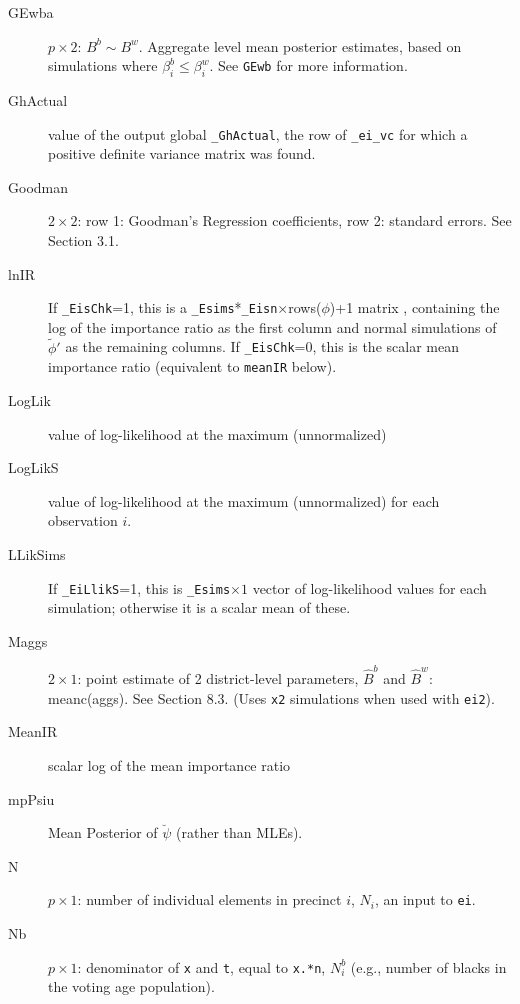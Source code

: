 \documentclass[11pt,titlepage]{article}
\newcommand{\psiu}{\breve{\psi}}
\newcommand{\Nbp}{{N_i^{b}}}
\newcommand{\Npp}{{N_i}}
\begin{document}
\begin{description}
\item[GEwba] $p\times 2$: $B^b\sim B^w$.  Aggregate level mean
  posterior estimates, based on simulations where
  $\beta_i^b\leq\beta_i^w$.  See \texttt{GEwb} for more information.
  
\item[GhActual] value of the output global \texttt{\_GhActual}, the
  row of \texttt{\_ei\_vc} for which a positive definite variance
  matrix was found.

\item[Goodman] $2\times 2$: row 1: Goodman's Regression coefficients,
  row 2: standard errors.  See Section 3.1.

\item[lnIR] If \texttt{\_EisChk}=1, this is a
  \texttt{\_Esims}*\texttt{\_Eisn}$\times$rows($\phi$)+1 matrix ,
  containing the log of the importance ratio as the first column and
  normal simulations of $\tilde{\phi}'$ as the remaining columns.  If
  \texttt{\_EisChk}=0, this is the scalar mean importance ratio
  (equivalent to \texttt{meanIR} below).

\item[LogLik] value of log-likelihood at the maximum (unnormalized)

\item[LogLikS] value of log-likelihood at the maximum (unnormalized)
  for each observation $i$.

\item[LLikSims] If \texttt{\_EiLlikS}=1, this is \texttt{\_Esims}$\times
  1$ vector of log-likelihood values for each simulation; otherwise it
  is a scalar mean of these.

\item[Maggs] $2\times 1$: point estimate of 2 district-level
  parameters, $\hat{B}^b$ and $\hat{B}^w$: meanc(aggs).  See Section
  8.3.  (Uses \texttt{x2} simulations when used with \texttt{ei2}).

\item[MeanIR] scalar log of the mean importance ratio

\item[mpPsiu] Mean Posterior of $\psiu$ (rather than MLEs).

\item[N] $p\times 1$: number of individual elements in precinct $i$,
  $\Npp$, an input to \texttt{ei}.

\item[Nb] $p\times 1$: denominator of \texttt{x} and \texttt{t},
  equal to \texttt{x.*n}, $\Nbp$ (e.g., number of blacks in the
  voting age population).


\end{description}
\end{document}
